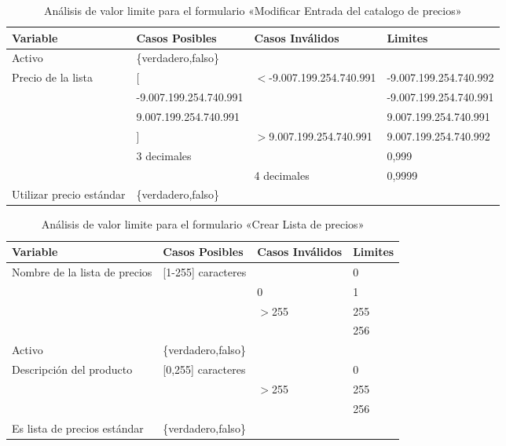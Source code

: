 \begin{table}[H]
\centering
\begin{tabular}{|p{3.0cm}|p{4.0cm}|p{4.0cm}|l|}
\hline
\footnotesize{\textbf{Variable}} & \footnotesize{\textbf{Casos Posibles}} & \footnotesize{\textbf{Casos Inválidos}} & \footnotesize{\textbf{Limites}} \\
\hline
\footnotesize{Activo} & \footnotesize{\{verdadero,falso\}} & & \\
\hline
\footnotesize{Precio de la lista} & \footnotesize{[} & \footnotesize{$<$-9.007.199.254.740.991} & \footnotesize{-9.007.199.254.740.992} \\
& \footnotesize{-9.007.199.254.740.991} & & \footnotesize{-9.007.199.254.740.991} \\
& \footnotesize{9.007.199.254.740.991} & & \footnotesize{9.007.199.254.740.991} \\
& \footnotesize{]} & \footnotesize{$>$9.007.199.254.740.991} & \footnotesize{9.007.199.254.740.992} \\
& \footnotesize{3 decimales} & & \footnotesize{0,999} \\
& & \footnotesize{4 decimales} & \footnotesize{0,9999} \\
\hline
\footnotesize{Utilizar precio estándar} & \footnotesize{\{verdadero,falso\}} & & \\
\hline
\end{tabular}
\caption{Análisis de valor limite para el formulario «Modificar Entrada del catalogo de precios»}
\label{myers_04}
\end{table}

\begin{table}[H]
\centering
\begin{tabular}{|p{6.0cm}|l|l|l|}
\hline
\footnotesize{\textbf{Variable}} & \footnotesize{\textbf{Casos Posibles}} & \footnotesize{\textbf{Casos Inválidos}} & \footnotesize{\textbf{Limites}} \\
\hline
\footnotesize{Nombre de la lista de precios} & \footnotesize{[1-255] caracteres} & & \footnotesize{0} \\
& & \footnotesize{0} & \footnotesize{1} \\
& & \footnotesize{$>$255} & \footnotesize{255} \\
& & & \footnotesize{256} \\
\hline
\footnotesize{Activo} & \footnotesize{\{verdadero,falso\}} & & \\
\hline
\footnotesize{Descripción del producto} & \footnotesize{[0,255] caracteres} & & \footnotesize{0} \\
& & \footnotesize{$>$255} & \footnotesize{255} \\
& & & \footnotesize{256} \\
\hline
\footnotesize{Es lista de precios estándar} & \footnotesize{\{verdadero,falso\}} & & \\
\hline
\end{tabular}
\caption{Análisis de valor limite para el formulario «Crear Lista de precios»}
\label{myers_05}
\end{table}

